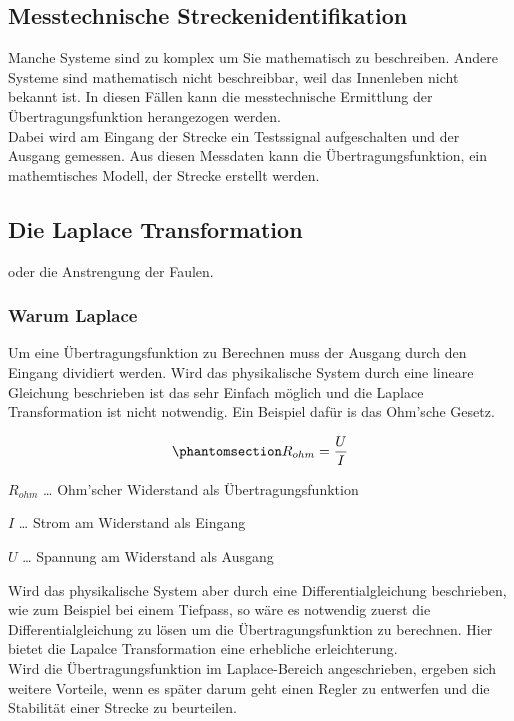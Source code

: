 \documentclass[
  letterpaper,
  DIV=11]{scrreprt}
\begin{document}
\subsection{Messtechnische
Streckenidentifikation}\label{sec-MessStreckenidentifikation}

Manche Systeme sind zu komplex um Sie mathematisch zu beschreiben.
Andere Systeme sind mathematisch nicht beschreibbar, weil das Innenleben
nicht bekannt ist. In diesen Fällen kann die messtechnische Ermittlung
der Übertragungsfunktion herangezogen werden.\\
Dabei wird am Eingang der Strecke ein Testssignal aufgeschalten und der
Ausgang gemessen. Aus diesen Messdaten kann die Übertragungsfunktion,
ein mathemtisches Modell, der Strecke erstellt werden.

\subsection{Die Laplace Transformation}\label{sec-Laplace}

oder die Anstrengung der Faulen.

\subsubsection{Warum Laplace}\label{warum-laplace}

Um eine Übertragungsfunktion zu Berechnen muss der Ausgang durch den
Eingang dividiert werden. Wird das physikalische System durch eine
lineare Gleichung beschrieben ist das sehr Einfach möglich und die
Laplace Transformation ist nicht notwendig. Ein Beispiel dafür is das
Ohm'sche Gesetz.

\begin{equation}\phantomsection\label{eq-Ohm_eq}{
R_{ohm} = \frac{U}{I}
}\end{equation}

\(R_{ohm}\) \ldots{} Ohm'scher Widerstand als Übertragungsfunktion

\(I\) \ldots{} Strom am Widerstand als Eingang

\(U\) \ldots{} Spannung am Widerstand als Ausgang

Wird das physikalische System aber durch eine Differentialgleichung
beschrieben, wie zum Beispiel bei einem Tiefpass, so wäre es notwendig
zuerst die Differentialgleichung zu lösen um die Übertragungsfunktion zu
berechnen. Hier bietet die Lapalce Transformation eine erhebliche
erleichterung.\\
Wird die Übertragungsfunktion im Laplace-Bereich angeschrieben, ergeben
sich weitere Vorteile, wenn es später darum geht einen Regler zu
entwerfen und die Stabilität einer Strecke zu beurteilen.
\end{document}
